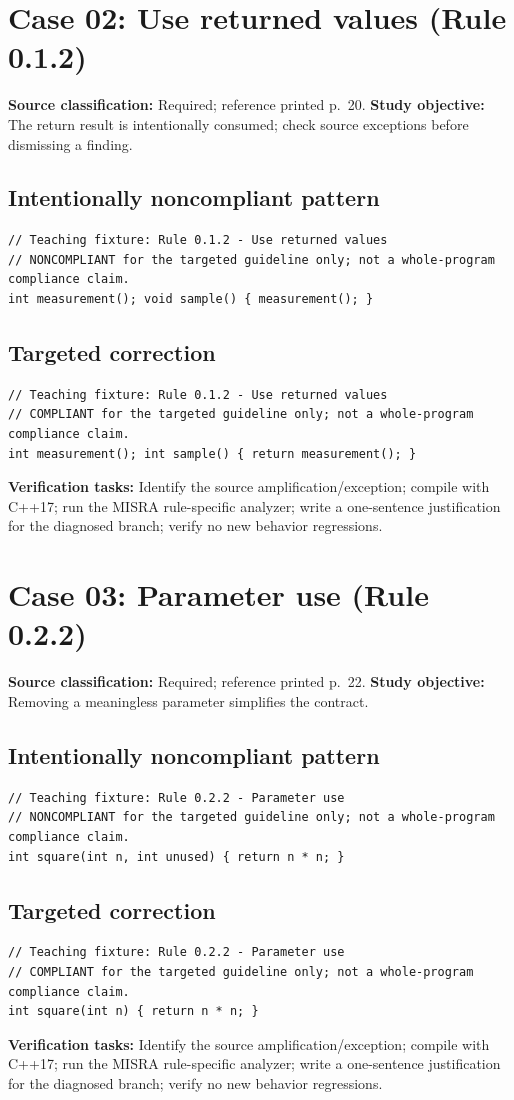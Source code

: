 \documentclass[10pt,letterpaper]{article}
\begin{document}
\section{Case 02: Use returned values (Rule 0.1.2)}
\textbf{Source classification:} Required; reference printed p.~20. \textbf{Study objective:} The return result is intentionally consumed; check source exceptions before dismissing a finding.
\subsection*{Intentionally noncompliant pattern}
\begin{lstlisting}
// Teaching fixture: Rule 0.1.2 - Use returned values
// NONCOMPLIANT for the targeted guideline only; not a whole-program compliance claim.
int measurement(); void sample() { measurement(); }
\end{lstlisting}
\subsection*{Targeted correction}
\begin{lstlisting}
// Teaching fixture: Rule 0.1.2 - Use returned values
// COMPLIANT for the targeted guideline only; not a whole-program compliance claim.
int measurement(); int sample() { return measurement(); }
\end{lstlisting}
\textbf{Verification tasks:} Identify the source amplification/exception; compile with C++17; run the MISRA rule-specific analyzer; write a one-sentence justification for the diagnosed branch; verify no new behavior regressions.

\section{Case 03: Parameter use (Rule 0.2.2)}
\textbf{Source classification:} Required; reference printed p.~22. \textbf{Study objective:} Removing a meaningless parameter simplifies the contract.
\subsection*{Intentionally noncompliant pattern}
\begin{lstlisting}
// Teaching fixture: Rule 0.2.2 - Parameter use
// NONCOMPLIANT for the targeted guideline only; not a whole-program compliance claim.
int square(int n, int unused) { return n * n; }
\end{lstlisting}
\subsection*{Targeted correction}
\begin{lstlisting}
// Teaching fixture: Rule 0.2.2 - Parameter use
// COMPLIANT for the targeted guideline only; not a whole-program compliance claim.
int square(int n) { return n * n; }
\end{lstlisting}
\textbf{Verification tasks:} Identify the source amplification/exception; compile with C++17; run the MISRA rule-specific analyzer; write a one-sentence justification for the diagnosed branch; verify no new behavior regressions.
\end{document}
